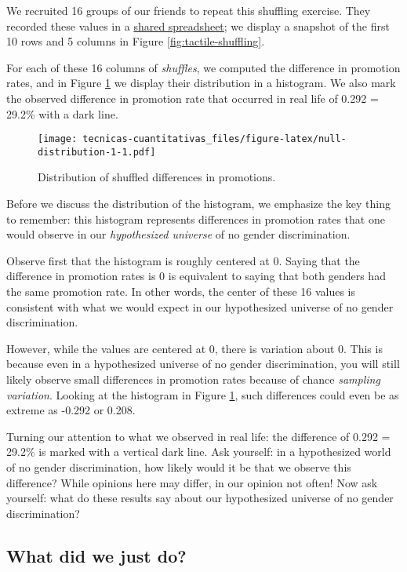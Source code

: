 \documentclass[
]{book}
\begin{document}
We recruited 16 groups of our friends to repeat this shuffling exercise. They recorded these values in a \href{https://docs.google.com/spreadsheets/d/1Q-ENy3o5IrpJshJ7gn3hJ5A0TOWV2AZrKNHMsshQtiE/}{shared spreadsheet}; we display a snapshot of the first 10 rows and 5 columns in Figure \ref{fig:tactile-shuffling}.

For each of these 16 columns of \emph{shuffles}, we computed the difference in promotion rates, and in Figure \ref{fig:null-distribution-1} we display their distribution in a histogram. We also mark the observed difference in promotion rate that occurred in real life of 0.292 = 29.2\% with a dark line.

\begin{figure}
\centering
\texttt{[image: tecnicas-cuantitativas\_files/figure-latex/null-distribution-1-1.pdf]}
\caption{\label{fig:null-distribution-1}Distribution of shuffled differences in promotions.}
\end{figure}

Before we discuss the distribution of the histogram, we emphasize the key thing to remember: this histogram represents differences in promotion rates that one would observe in our \emph{hypothesized universe} of no gender discrimination.

Observe first that the histogram is roughly centered at 0. Saying that the difference in promotion rates is 0 is equivalent to saying that both genders had the same promotion rate. In other words, the center of these 16 values is consistent with what we would expect in our hypothesized universe of no gender discrimination.

However, while the values are centered at 0, there is variation about 0. This is because even in a hypothesized universe of no gender discrimination, you will still likely observe small differences in promotion rates because of chance \emph{sampling variation}. Looking at the histogram in Figure \ref{fig:null-distribution-1}, such differences could even be as extreme as -0.292 or 0.208.

Turning our attention to what we observed in real life: the difference of 0.292 = 29.2\% is marked with a vertical dark line. Ask yourself: in a hypothesized world of no gender discrimination, how likely would it be that we observe this difference? While opinions here may differ, in our opinion not often! Now ask yourself: what do these results say about our hypothesized universe of no gender discrimination?

\hypertarget{ht-what-did-we-just-do}{%
\subsection{What did we just do?}\label{ht-what-did-we-just-do}}
\end{document}
